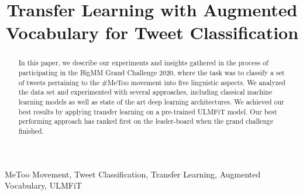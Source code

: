 \documentclass[10pt, conference,compsocconf]{IEEEtran}
\begin{document}
	

	\title{Transfer Learning with Augmented Vocabulary for Tweet Classification}
	
	\author{
		\and
	}
	
	
	
	\maketitle
	\begin{abstract}
	In this paper, we describe our experiments and insights gathered in the process of participating in the BigMM Grand Challenge 2020, where the task was to classify a set of tweets pertaining to the \#MeToo movement into five linguistic aspects. We analyzed the data set and experimented with several approaches, including classical machine learning models as well as state of the art deep learning architectures. We achieved our best results by applying transfer learning on a pre-trained ULMFiT model. Our best performing approach has ranked first on the leader-board when the grand challenge finished. 
	\end{abstract}
	
	\begin{IEEEkeywords}
		MeToo Movement, Tweet Classification, Transfer Learning, Augmented Vocabulary, ULMFiT
	\end{IEEEkeywords}
	
	 
	\IEEEpeerreviewmaketitle
	
    
    






 \nocite{*} 


	
	\balance 
	
	
\end{document}
